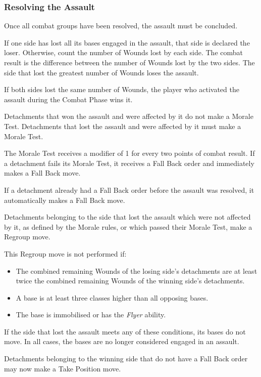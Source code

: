 \subsubsection{Resolving the Assault}

Once all combat groups have been resolved, the assault must be concluded.

If one side has lost all its bases engaged in the assault, that side is declared the loser. Otherwise, count the number of Wounds lost by each side. The combat result is the difference between the number of Wounds lost by the two sides. The side that lost the greatest number of Wounds loses the assault.

If both sides lost the same number of Wounds, the player who activated the assault during the Combat Phase wins it.

Detachments that won the assault and were affected by it do not make a Morale Test. Detachments that lost the assault and were affected by it must make a Morale Test.

The Morale Test receives a modifier of 1 for every two points of combat result. If a detachment fails its Morale Test, it receives a Fall Back order and immediately makes a Fall Back move.

If a detachment already had a Fall Back order before the assault was resolved, it automatically makes a Fall Back move.

Detachments belonging to the side that lost the assault which were not affected by it, as defined by the Morale rules, or which passed their Morale Test, make a Regroup move.

This Regroup move is not performed if:

\begin{itemize}
    \item The combined remaining Wounds of the losing side's detachments are at least twice the combined remaining Wounds of the winning side's detachments.
    \item A base is at least three classes higher than all opposing bases.
    \item The base is immobilised or has the \textit{Flyer} ability.
\end{itemize}

If the side that lost the assault meets any of these conditions, its bases do not move. In all cases, the bases are no longer considered engaged in an assault.

Detachments belonging to the winning side that do not have a Fall Back order may now make a Take Position move.

